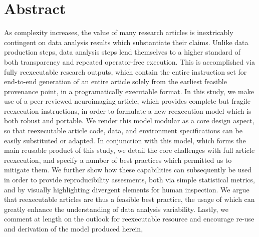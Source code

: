 \section{Abstract}

As complexity increases, the value of many research articles is inextricably contingent on data analysis results which substantiate their claims.
Unlike data production steps, data analysis steps lend themselves to a higher standard of both transparency and repeated operator-free execution.
This is accomplished via fully reexecutable research outputs, which contain the entire instruction set for end-to-end generation of an entire article solely from the earliest feasible provenance point, in a programatically executable format.
In this study, we make use of a peer-reviewed neuroimaging article, which provides complete but fragile reexecution instructions, in order to formulate a new reexecution model which is both robust and portable.
We render this model modular as a core design aspect, so that reexecutable article code, data, and environment specifications can be easily substituted or adapted.
In conjunction with this model, which forms the main reusable product of this study, we detail the core challenges with full article reexecution, and specify a number of best practices which permitted us to mitigate them.
We further show how these capabilities can subsequently be used in order to provide reproducibility assesments, both via simple statistical metrics, and by visually highlighting divergent elements for human inspection.
We argue that reexecutable articles are thus a feasible best practice, the usage of which can greatly enhance the understanding of data analysis variability.
Lastly, we comment at length on the outlook for reexecutable resource and encourage re-use and derivation of the model produced herein, 


